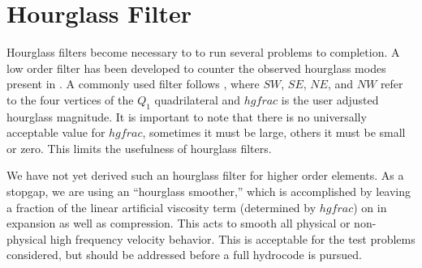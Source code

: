 \section{Hourglass Filter}
Hourglass filters become necessary to to run several problems to completion. A low order filter has been developed to counter the observed hourglass modes present in . A commonly used filter follows , where $SW$, $SE$, $NE$, and $NW$ refer to the four vertices of the $Q_1$ quadrilateral and $hgfrac$ is the user adjusted hourglass magnitude. It is important to note that there is no universally acceptable value for $hgfrac$, sometimes it must be large, others it must be small or zero. This limits the usefulness of hourglass filters.

We have not yet derived such an hourglass filter for higher order elements. As a stopgap, we are using an ``hourglass smoother,'' which is accomplished by leaving a fraction of the linear artificial viscosity term (determined by $hgfrac$) on in expansion as well as compression. This acts to smooth all physical or non-physical high frequency velocity behavior. This is acceptable for the test problems considered, but should be addressed before a full hydrocode is pursued.

